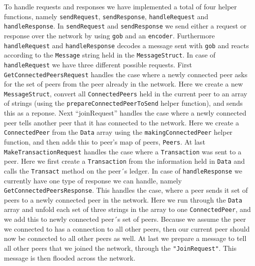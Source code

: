 \documentclass[
  paper=a4,
  ,captions=tableheading
]{scrartcl}
\newcommand{\passthrough}[1]{#1}
\begin{document}
To handle requests and responses we have implemented a total of four
helper functions, namely \passthrough{\lstinline!sendRequest!},
\passthrough{\lstinline!sendResponse!},
\passthrough{\lstinline!handleRequest!} and
\passthrough{\lstinline!handleResponse!}. In
\passthrough{\lstinline!sendRequest!} and
\passthrough{\lstinline!sendResponse!} we send either a request or
response over the network by using \passthrough{\lstinline!gob!} and an
\passthrough{\lstinline!encoder!}. Furthermore
\passthrough{\lstinline!handleRequest!} and
\passthrough{\lstinline!handleResponse!} decodes a message sent with
\passthrough{\lstinline!gob!} and reacts according to the
\passthrough{\lstinline!Message!} string held in the
\passthrough{\lstinline!MessageStruct!}. In case of
\passthrough{\lstinline!handleRequest!} we have three different possible
requests. First \passthrough{\lstinline!GetConnectedPeersRequest!}
handles the case where a newly connected peer asks for the set of peers
from the peer already in the network. Here we create a new
\passthrough{\lstinline!MessageStruct!}, convert all
\passthrough{\lstinline!ConnectedPeers!} held in the current peer to an
array of strings (using the
\passthrough{\lstinline!prepareConnectedPeerToSend!} helper function),
and sends this as a reponse. Next ``joinRequest'' handles the case where
a newly connected peer tells another peer that it has connected to the
network. Here we create a \passthrough{\lstinline!ConnectedPeer!} from
the \passthrough{\lstinline!Data!} array using the
\passthrough{\lstinline!makingConnectedPeer!} helper function, and then
adds this to peer's map of peers, \passthrough{\lstinline!Peers!}. At
last \passthrough{\lstinline!MakeTransactionRequest!} handles the case
where a \passthrough{\lstinline!Transaction!} was sent to a peer. Here
we first create a \passthrough{\lstinline!Transaction!} from the
information held in \passthrough{\lstinline!Data!} and calls the
\passthrough{\lstinline!Transact!} method on the peer´s ledger. In case
of \passthrough{\lstinline!handleResponse!} we currently have one type
of response we can handle, namely
\passthrough{\lstinline!GetConnectedPeersResponse!}. This handles the
case, where a peer sends it set of peers to a newly connected peer in
the network. Here we run through the \passthrough{\lstinline!Data!}
array and unfold each set of three strings in the array to one
\passthrough{\lstinline!ConnectedPeer!}, and we add this to newly
connected peer´s set of peers. Because we assume the peer we connected
to has a connection to all other peers, then our current peer should now
be connected to all other peers as well. At last we prepare a message to
tell all other peers that we joined the network, through the
\passthrough{\lstinline!"JoinRequest"!}. This message is then flooded
across the network.
\end{document}
